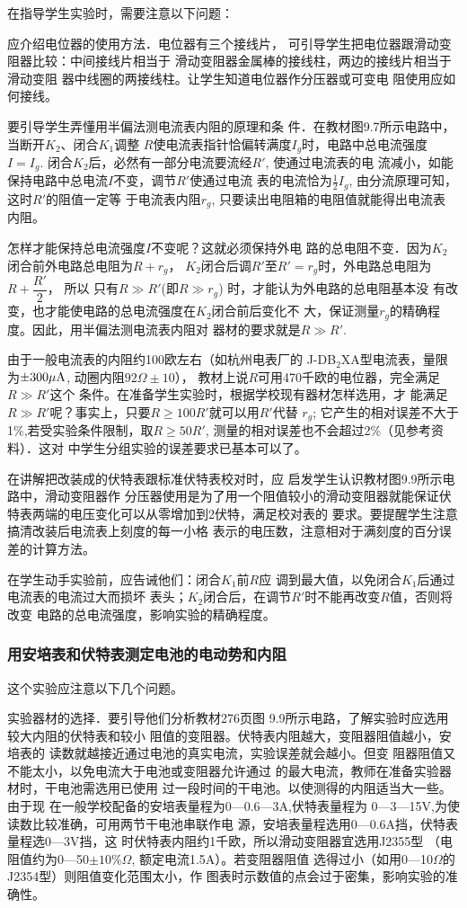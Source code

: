 在指导学生实验时，需要注意以下问题：

应介绍电位器的使用方法．电位器有三个接线片，
可引导学生把电位器跟滑动变阻器比较：中间接线片相当于
滑动变阻器金属棒的接线柱，两边的接线片相当于滑动变阻
器中线圈的两接线柱。让学生知道电位器作分压器或可变电
阻使用应如何接线。

要引导学生弄懂用半偏法测电流表内阻的原理和条
件．在教材图9.7所示电路中，当断开$K_2$、闭合$K_1$调整
$R$使电流表指针恰偏转满度$I_g$时，电路中总电流强度$I=I_g$.
闭合$K_2$后，必然有一部分电流要流经$R'$, 使通过电流表的电
流减小，如能保持电路中总电流$I$不变，调节$R'$使通过电流
表的电流恰为$\frac{1}{2}I_g$, 由分流原理可知，这时$R'$的阻值一定等
于电流表内阻$r_g$, 只要读出电阻箱的电阻值就能得出电流表
内阻。

怎样才能保持总电流强度$I$不变呢？这就必须保持外电
路的总电阻不变．因为$K_2$闭合前外电路总电阻为$R+r_g$，
$K_2$闭合后调$R'$至$R'=r_g$时，外电路总电阻为$R+\dfrac{R'}{2}$，
所以
只有$R\gg R'$(即$R\gg r_g$) 时，才能认为外电路的总电阻基本没
有改变，也才能使电路的总电流强度在$K_2$闭合前后变化不
大，保证测量$r_g$的精确程度。因此，用半偏法测电流表内阻对
器材的要求就是$R\gg R'$.

由于一般电流表的内阻约100欧左右（如杭州电表厂的
J-DB$_2$XA型电流表，量限为$\pm300\mu {\rm A}$, 动圈内阻$92{\Omega}\pm 10$），
教材上说$R$可用470千欧的电位器，完全满足$R\gg R'$这个
条件。在准备学生实验时，根据学校现有器材怎样选用，才
能满足$R\gg R'$呢？事实上，只要$R\ge 100R'$就可以用$R'$代替
$r_g$; 它产生的相对误差不大于1\%,若受实验条件限制，取$R\ge 
50R'$, 测量的相对误差也不会超过2\%（见参考资料）．这对
中学生分组实验的误差要求已基本可以了。

在讲解把改装成的伏特表跟标准伏特表校对时，应
启发学生认识教材图9.9所示电路中，滑动变阻器作
分压器使用是为了用一个阻值较小的滑动变阻器就能保证伏
特表两端的电压变化可以从零增加到2伏特，满足校对表的
要求。要提醒学生注意搞清改装后电流表上刻度的每一小格
表示的电压数，注意相对于满刻度的百分误差的计算方法。

在学生动手实验前，应告诫他们：闭合$K_1$前$R$应
调到最大值，以免闭合$K_1$后通过电流表的电流过大而损坏
表头；$K_2$闭合后，在调节$R'$时不能再改变$R$值，否则将改变
电路的总电流强度，影响实验的精确程度。

\subsubsection{用安培表和伏特表测定电池的电动势和内阻}
这个实验应注意以下几个问题。

实验器材的选择．要引导他们分析教材276页图
9.9所示电路，了解实验时应选用较大内阻的伏特表和较小
阻值的变阻器。伏特表内阻越大，变阻器阻值越小，安培表的
读数就越接近通过电池的真实电流，实验误差就会越小。但变
阻器阻值又不能太小，以免电流大于电池或变阻器允许通过
的最大电流，教师在准备实验器材时，干电池需选用已使用
过一段时间的干电池。以使测得的内阻适当大一些。由于现
在一般学校配备的安培表量程为0—0.6—3A,伏特表量程为
0—3—15V,为使读数比较准确，可用两节干电池串联作电
源，安培表量程选用0—0.6A挡，伏特表量程选0—3V挡，这
时伏特表内阻约1千欧，所以滑动变阻器宜选用J2355型
（电阻值约为0—50$\pm 10\%\Omega$, 额定电流1.5A）。若变阻器阻值
选得过小（如用0—10$\Omega$的J2354型）则阻值变化范围太小，作
图表时示数值的点会过于密集，影响实验的准确性。

